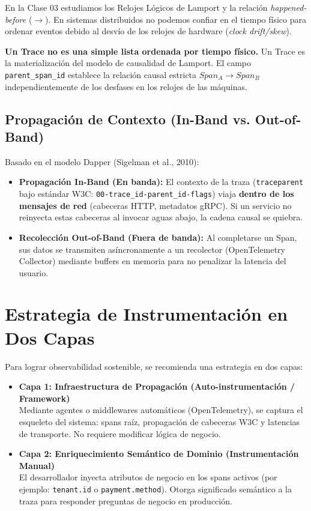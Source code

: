 \documentclass[variant=apuntes,cover=institutional,mode=screen]{ua-engineering-v6-article}
\begin{document}
En la Clase 03 estudiamos los Relojes Lógicos de Lamport y la relación \emph{happened-before} ($\rightarrow$). En sistemas distribuidos no podemos confiar en el tiempo físico para ordenar eventos debido al desvío de los relojes de hardware (\emph{clock drift/skew}).

\textbf{Un Trace no es una simple lista ordenada por tiempo físico.} Un Trace es la materialización del modelo de causalidad de Lamport. El campo \texttt{parent\_span\_id} establece la relación causal estricta $Span_A \rightarrow Span_B$ independientemente de los desfases en los relojes de las máquinas.

\subsection{Propagación de Contexto (In-Band vs. Out-of-Band)}
Basado en el modelo Dapper (Sigelman et al., 2010):
\begin{itemize}
\item \textbf{Propagación In-Band (En banda):} El contexto de la traza (\texttt{traceparent} bajo estándar W3C: \texttt{00-trace\_id-parent\_id-flags}) viaja \textbf{dentro de los mensajes de red} (cabeceras HTTP, metadatos gRPC). Si un servicio no reinyecta estas cabeceras al invocar aguas abajo, la cadena causal se quiebra.
\item \textbf{Recolección Out-of-Band (Fuera de banda):} Al completarse un Span, sus datos se transmiten asíncronamente a un recolector (OpenTelemetry Collector) mediante buffers en memoria para no penalizar la latencia del usuario.
\end{itemize}

\section{Estrategia de Instrumentación en Dos Capas}

Para lograr observabilidad sostenible, se recomienda una estrategia en dos capas:

\begin{itemize}
\item \textbf{Capa 1: Infraestructura de Propagación (Auto-instrumentación / Framework)}\\
Mediante agentes o middlewares automáticos (OpenTelemetry), se captura el esqueleto del sistema: spans raíz, propagación de cabeceras W3C y latencias de transporte. No requiere modificar lógica de negocio.
\item \textbf{Capa 2: Enriquecimiento Semántico de Dominio (Instrumentación Manual)}\\
El desarrollador inyecta atributos de negocio en los spans activos (por ejemplo: \texttt{tenant.id} o \texttt{payment.method}). Otorga significado semántico a la traza para responder preguntas de negocio en producción.
\end{itemize}
\end{document}
